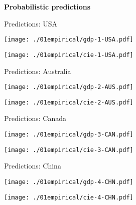 \documentclass[notes,blackandwhite,mathsans,usenames,dvipsnames]{beamer}
\begin{document}
{
\begin{frame}

\begin{adjustwidth}{-0.5cm}{0cm}
\vspace{8.3cm}\Large
\textbf{{\color{blu}Probabilistic} {\color{gre}predictions}}
\end{adjustwidth}

\end{frame}
}



\begin{frame}{Predictions: USA}

\begin{center}
\texttt{[image: ./01empirical/gdp-1-USA.pdf]}

\texttt{[image: ./01empirical/cie-1-USA.pdf]}
\end{center}
\end{frame}



\begin{frame}{Predictions: Australia}

\begin{center}
\texttt{[image: ./01empirical/gdp-2-AUS.pdf]}

\texttt{[image: ./01empirical/cie-2-AUS.pdf]}

\end{center}
\end{frame}




\begin{frame}{Predictions: Canada}

\begin{center}
\texttt{[image: ./01empirical/gdp-3-CAN.pdf]}

\texttt{[image: ./01empirical/cie-3-CAN.pdf]}
\end{center}
\end{frame}

\begin{frame}{Predictions: China}

\begin{center}
\texttt{[image: ./01empirical/gdp-4-CHN.pdf]}

\texttt{[image: ./01empirical/cie-4-CHN.pdf]}
\end{center}
\end{frame}
\end{document}
